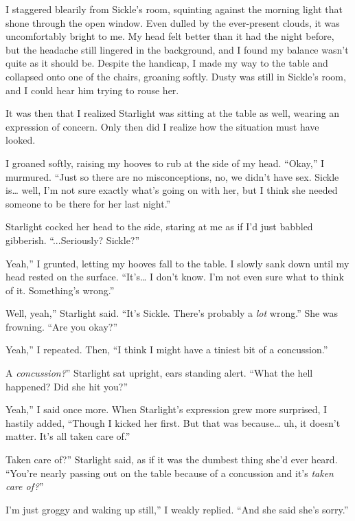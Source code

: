 I staggered blearily from Sickle’s room, squinting against the morning light that shone through the open window. Even dulled by the ever-present clouds, it was uncomfortably bright to me. My head felt better than it had the night before, but the headache still lingered in the background, and I found my balance wasn’t quite as it should be. Despite the handicap, I made my way to the table and collapsed onto one of the chairs, groaning softly. Dusty was still in Sickle’s room, and I could hear him trying to rouse her.

It was then that I realized Starlight was sitting at the table as well, wearing an expression of concern. Only then did I realize how the situation must have looked.

I groaned softly, raising my hooves to rub at the side of my head. “Okay,” I murmured. “Just so there are no misconceptions, no, we didn’t have sex. Sickle is… well, I’m not sure exactly what’s going on with her, but I think she needed someone to be there for her last night.”

Starlight cocked her head to the side, staring at me as if I’d just babbled gibberish. “...Seriously? Sickle?”

\leavevmode{}Yeah,” I grunted, letting my hooves fall to the table. I slowly sank down until my head rested on the surface. “It’s… I don’t know. I’m not even sure what to think of it. Something’s wrong.”

\leavevmode{}Well, yeah,” Starlight said. “It’s Sickle. There’s probably a \textit{lot} wrong.” She was frowning. “Are you okay?”

\leavevmode{}Yeah,” I repeated. Then, “I think I might have a tiniest bit of a concussion.”

\leavevmode{}A \textit{concussion?}” Starlight sat upright, ears standing alert. “What the hell happened? Did she hit you?”

\leavevmode{}Yeah,” I said once more. When Starlight’s expression grew more surprised, I hastily added, “Though I kicked her first. But that was because… uh, it doesn’t matter. It’s all taken care of.”

\leavevmode{}Taken care of?” Starlight said, as if it was the dumbest thing she’d ever heard. “You’re nearly passing out on the table because of a concussion and it’s \textit{taken care of?}”

\leavevmode{}I’m just groggy and waking up still,” I weakly replied. “And she said she’s sorry.”

